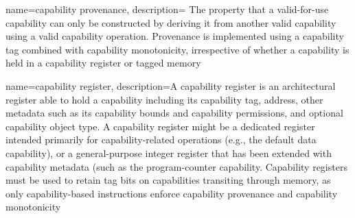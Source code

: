 {
  name=capability provenance,
  description={
The property that a valid-for-use \gls{capability} can only be
    constructed by deriving it from another valid capability
    using a valid capability operation.
    Provenance is implemented using a \gls{capability tag} combined with
    \gls{capability monotonicity},
irrespective of
%
whether a
    capability is held in a \gls{capability register} or \gls{tagged memory}}
}

{
  name=capability register,
  description={A capability register is an architectural register able to hold
    a \gls{capability} including its \gls{capability tag}, \gls{address},
    other  metadata such as
    its \gls{capability bounds} and \gls{capability permissions}, and optional
    \gls{capability object type}.
    A capability register might be a dedicated register intended primarily for
    capability-related operations (e.g., the \gls{default data capability}), or a general-purpose integer
    register that has been extended with capability metadata (such as the
    \gls{program-counter capability}.
    Capability registers must be used to retain tag bits on capabilities
    transiting through memory, as only \gls{capability-based instructions}
    enforce \gls{capability provenance} and \gls{capability monotonicity}}
}

